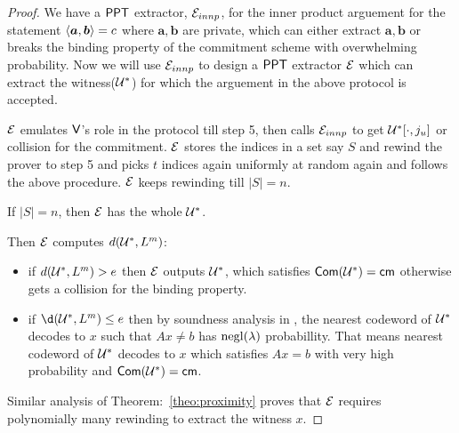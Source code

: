 \begin{proof}
	We have a $\mathsf{PPT}$ extractor, $\mathcal{E}_{innp}$, for the inner product arguement for the statement $\langle \bm{a},\bm{b}\rangle=c$ where $\bm{a},\bm{b}$ are private, which can either extract $\bm{a}, \bm{b}$ or breaks the binding property of the commitment scheme with overwhelming probability. Now we will use $\mathcal{E}_{innp}$ to design a $\mathsf{PPT}$ extractor $\mathcal{E}$ which can extract the witness($\mathcal{U}^*$) for which the arguement in the above protocol is accepted.
	
	$\mathcal{E}$ emulates $\mathsf{V}$'s role in the protocol till step 5, then calls $\mathcal{E}_{innp}$ to get $\mathcal{U}^*[\cdot,j_u]$ or collision for the commitment. $\mathcal{E}$ stores the indices in a set say $S$ and rewind the prover to step 5 and picks $t$ indices again uniformly at random again and follows the above procedure. $\mathcal{E}$ keeps rewinding till $|S|=n$.
	
	If $|S|=n$, then $\mathcal{E}$ has the whole $\mathcal{U}^*$.
	
	Then $\mathcal{E}$ computes $d(\mathcal{U}^*, L^m)$:
	\begin{itemize}
		\item if $d(\mathcal{U}^*,L^m) > e$ then $\mathcal{E}$ outputs $\mathcal{U}^*$, which satisfies $\mathsf{Com}(\mathcal{U}^*)=\mathsf{cm}$ otherwise gets a collision for the binding property.
		
		\item if $\d(\calU^*,L^m) \leq e$ then by soundness analysis in \cite{Ligero2017}, the nearest codeword of $\mathcal{U}^*$ decodes to $x$ such that $Ax\neq b$ has $\mathrm{negl}(\lambda)$ probabillity. That means nearest codeword of $\mathcal{U}^*$ decodes to $x$ which satisfies $Ax=b$ with very high probability and $\mathsf{Com}(\mathcal{U}^*)=\mathsf{cm}$.
	\end{itemize}
	
	Similar analysis of Theorem:~\ref{theo:proximity} proves that $\mathcal{E}$ requires polynomially many rewinding to extract the witness $x$.
\end{proof}
